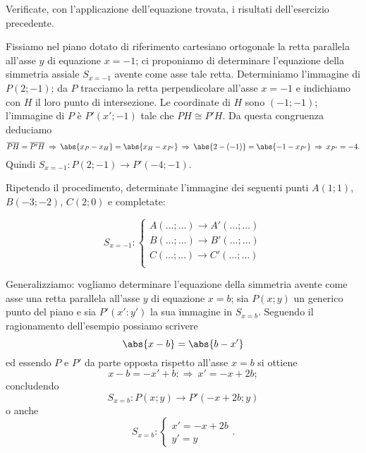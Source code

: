 Verificate, con l'applicazione dell'equazione trovata, i risultati 
dell'esercizio precedente.

\begin{exrig}
\begin{esempio}
Fissiamo nel piano dotato di riferimento cartesiano ortogonale la 
retta parallela all'asse $y$ di equazione $x=-1$; ci proponiamo di 
determinare l'equazione della simmetria assiale $S_{x=-1}$ avente 
come asse tale retta. Determiniamo l'immagine di $P(2;-1)$; da $P$ 
tracciamo la retta perpendicolare all'asse $x=-1$ e indichiamo con 
$H$ il loro punto di intersezione. Le coordinate di $H$ sono 
$(-1;-1)$; l'immagine di $P$ è $P'(x';-1)$ tale che $PH\cong P'H$. Da 
questa congruenza deduciamo
\[\overline{PH}=\overline{P'H}\:\Rightarrow\:\abs{x_P-x_H}=\abs{x_H-x_
{P'}}\:\Rightarrow\:\abs{2-(-1)}=\abs{-1-x_{P'}}\:\Rightarrow\:x_{P'}
=-4.\]
Quindi $S_{x=-1}:P(2;-1)\rightarrow P'(-4;-1)$.

\begin{figure*}[!htb]
	
\centering
\end{figure*}

Ripetendo il procedimento, determinate l'immagine dei seguenti punti 
$A(1;1)$, $B(-3;-2)$, $C(2;0)$ e completate:

\[S_{x=-1}:\begin{cases}A(\ldots{};\ldots{}) \rightarrow 
A'(\ldots{};\ldots{})\\
B(\ldots{};\ldots{}) \rightarrow B'(\ldots{};\ldots{})\\
C(\ldots{};\ldots{}) \rightarrow C'(\ldots{};\ldots{})\\ \end{cases}\]
\end{esempio}
\end{exrig}

Generalizziamo: vogliamo determinare l'equazione della simmetria 
avente come asse una retta parallela all'asse $y$ di equazione $x=b$; 
sia $P(x;y)$ un generico punto del piano e sia $P'(x':y')$ la sua 
immagine in $S_{x=b}$. Seguendo il ragionamento dell'esempio possiamo 
scrivere \[\abs{x-b}=\abs{b-x'}\]
ed essendo $P$ e $P'$ da parte opposta rispetto all'asse $x=b$ si 
ottiene
\[x-b=-x'+b:\Rightarrow\: x'=-x+2b;\]
concludendo
\[S_{x=b}:P(x;y)\rightarrow P'(-x+2b;y)\]
o anche
\[S_{x=b}:\begin{cases}x'=-x+2b\\y'=y \end{cases}.\]



